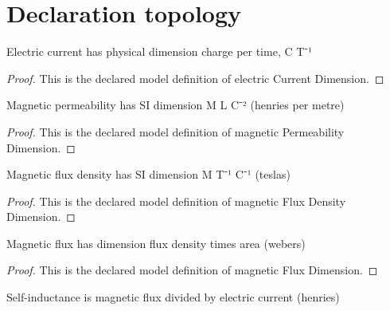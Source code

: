 \section{Declaration topology}
\begin{definition}
  \label{def:physics:phyx-mini-0940:phyxminiproblems-problemphyxmini0940-electriccurrentdimension}
  Electric current has physical dimension charge per time, C T⁻¹
\end{definition}
\begin{proof}
  This is the declared model definition of electric Current Dimension.
\end{proof}
\begin{definition}
  \label{def:physics:phyx-mini-0940:phyxminiproblems-problemphyxmini0940-magneticpermeabilitydimension}
  Magnetic permeability has SI dimension M L C⁻² (henries per metre)
\end{definition}
\begin{proof}
  This is the declared model definition of magnetic Permeability Dimension.
\end{proof}
\begin{definition}
  \label{def:physics:phyx-mini-0940:phyxminiproblems-problemphyxmini0940-magneticfluxdensitydimension}
  Magnetic flux density has SI dimension M T⁻¹ C⁻¹ (teslas)
\end{definition}
\begin{proof}
  This is the declared model definition of magnetic Flux Density Dimension.
\end{proof}
\begin{definition}
  \label{def:physics:phyx-mini-0940:phyxminiproblems-problemphyxmini0940-magneticfluxdimension}
  Magnetic flux has dimension flux density times area (webers)
\end{definition}
\begin{proof}
  This is the declared model definition of magnetic Flux Dimension.
\end{proof}
\begin{definition}
  \label{def:physics:phyx-mini-0940:phyxminiproblems-problemphyxmini0940-inductancedimension}
  Self-inductance is magnetic flux divided by electric current (henries)
\end{definition}
